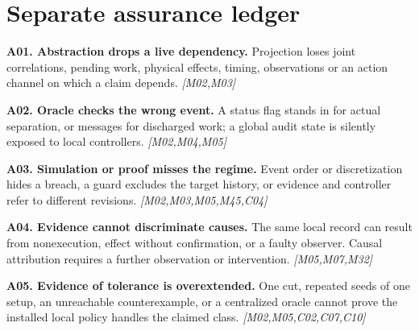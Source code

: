 \documentclass[11pt]{article}
\newcommand{\f}[4]{\par\smallskip\noindent\textbf{#1. #2.} #3 \textit{[#4]}\par}
\begin{document}
\section{Separate assurance ledger}
\f{A01}{Abstraction drops a live dependency}{Projection loses joint correlations, pending work, physical effects, timing, observations or an action channel on which a claim depends.}{M02,M03}
\f{A02}{Oracle checks the wrong event}{A status flag stands in for actual separation, or messages for discharged work; a global audit state is silently exposed to local controllers.}{M02,M04,M05}
\f{A03}{Simulation or proof misses the regime}{Event order or discretization hides a breach, a guard excludes the target history, or evidence and controller refer to different revisions.}{M02,M03,M05,M45,C04}
\f{A04}{Evidence cannot discriminate causes}{The same local record can result from nonexecution, effect without confirmation, or a faulty observer. Causal attribution requires a further observation or intervention.}{M05,M07,M32}
\f{A05}{Evidence of tolerance is overextended}{One cut, repeated seeds of one setup, an unreachable counterexample, or a centralized oracle cannot prove the installed local policy handles the claimed class.}{M02,M05,C02,C07,C10}
\end{document}
